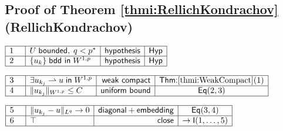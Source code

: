 \documentclass[11pt,reqno]{amsart}
\begin{document}
	\subsection*{Proof of Theorem \protect\ref{thmi:RellichKondrachov} (\textsf{RellichKondrachov})}
	\noindent$\begin{array}{|m{0.5cm}|l|r|c|}
	\hline
	1 & U\;\mathsf{bounded},\;q<p^{*} & \mathsf{hypothesis} & \mathsf{Hyp} \\ \hline
	2 & \{u_{k}\}\;\mathsf{bdd\ in}\;W^{1,p} & \mathsf{hypothesis} & \mathsf{Hyp} \\ \hline
	\end{array}$
	\par\nointerlineskip\noindent$\begin{array}{|m{0.5cm}|l|r|c|}
	\hline
	3 & \exists u_{k_{j}}\rightharpoonup u\;\mathsf{in}\;W^{1,p} & \mathsf{weak\ compact} & \textsf{Thm:}\ref{thmi:WeakCompact}(1) \\ \hline
	4 & \|u_{k_{j}}\|_{W^{1,p}}\le C & \mathsf{uniform\ bound} & \mathsf{Eq}(2,3) \\ \hline
	\end{array}$
	\par\nointerlineskip\noindent$\begin{array}{|m{0.5cm}|l|r|c|}
	\hline
	5 & \|u_{k_{j}}-u\|_{L^{q}}\to0 & \mathsf{diagonal+embedding} & \mathsf{Eq}(3,4) \\ \hline
	6 & \top & \mathsf{close} & \to\mathsf{I}(1,\dots,5) \\ \hline
	\end{array}$
	\medskip
	
\end{document}
